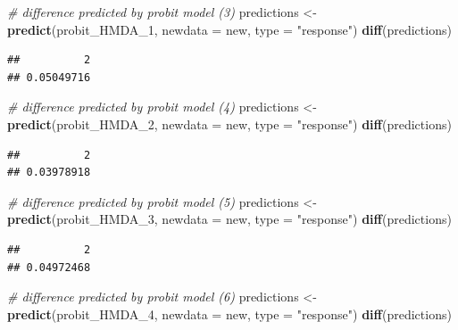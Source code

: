 \documentclass[]{book}
\newenvironment{Shaded}{\begin{snugshade}}{\end{snugshade}}
\newcommand{\KeywordTok}[1]{\textcolor[rgb]{0.13,0.29,0.53}{\textbf{#1}}}
\newcommand{\DataTypeTok}[1]{\textcolor[rgb]{0.13,0.29,0.53}{#1}}
\newcommand{\DecValTok}[1]{\textcolor[rgb]{0.00,0.00,0.81}{#1}}
\newcommand{\StringTok}[1]{\textcolor[rgb]{0.31,0.60,0.02}{#1}}
\newcommand{\CommentTok}[1]{\textcolor[rgb]{0.56,0.35,0.01}{\textit{#1}}}
\newcommand{\NormalTok}[1]{#1}
\theoremstyle{definition}
\theoremstyle{definition}
\theoremstyle{definition}
\theoremstyle{remark}
\begin{document}
\begin{Shaded}
\begin{Highlighting}[]
\CommentTok{# difference predicted by probit model (3)}
\NormalTok{predictions <-}\StringTok{ }\KeywordTok{predict}\NormalTok{(probit_HMDA_}\DecValTok{1}\NormalTok{, }\DataTypeTok{newdata =}\NormalTok{ new, }\DataTypeTok{type =} \StringTok{"response"}\NormalTok{)}
\KeywordTok{diff}\NormalTok{(predictions)}
\end{Highlighting}
\end{Shaded}

\begin{verbatim}
##          2 
## 0.05049716
\end{verbatim}

\begin{Shaded}
\begin{Highlighting}[]
\CommentTok{# difference predicted by probit model (4)}
\NormalTok{predictions <-}\StringTok{ }\KeywordTok{predict}\NormalTok{(probit_HMDA_}\DecValTok{2}\NormalTok{, }\DataTypeTok{newdata =}\NormalTok{ new, }\DataTypeTok{type =} \StringTok{"response"}\NormalTok{)}
\KeywordTok{diff}\NormalTok{(predictions)}
\end{Highlighting}
\end{Shaded}

\begin{verbatim}
##          2 
## 0.03978918
\end{verbatim}

\begin{Shaded}
\begin{Highlighting}[]
\CommentTok{# difference predicted by probit model (5)}
\NormalTok{predictions <-}\StringTok{ }\KeywordTok{predict}\NormalTok{(probit_HMDA_}\DecValTok{3}\NormalTok{, }\DataTypeTok{newdata =}\NormalTok{ new, }\DataTypeTok{type =} \StringTok{"response"}\NormalTok{)}
\KeywordTok{diff}\NormalTok{(predictions)}
\end{Highlighting}
\end{Shaded}

\begin{verbatim}
##          2 
## 0.04972468
\end{verbatim}

\begin{Shaded}
\begin{Highlighting}[]
\CommentTok{# difference predicted by probit model (6)}
\NormalTok{predictions <-}\StringTok{ }\KeywordTok{predict}\NormalTok{(probit_HMDA_}\DecValTok{4}\NormalTok{, }\DataTypeTok{newdata =}\NormalTok{ new, }\DataTypeTok{type =} \StringTok{"response"}\NormalTok{)}
\KeywordTok{diff}\NormalTok{(predictions)}
\end{Highlighting}
\end{Shaded}
\end{document}
